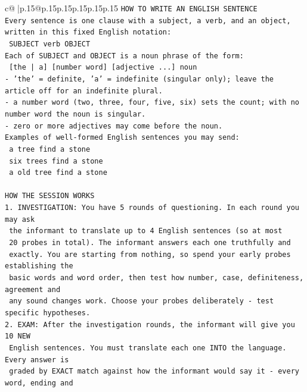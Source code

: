 \documentclass{article}
\begin{document}
{\begin{supertabular}{c@{$\;$}|p{.15\linewidth}@{}p{.15\linewidth}p{.15\linewidth}p{.15\linewidth}p{.15\linewidth}p{.15\linewidth}}
{{{\texttt{HOW TO WRITE AN ENGLISH SENTENCE} \\
\texttt{Every sentence is one clause with a subject, a verb, and an object, written in this fixed English notation:} \\
\texttt{    SUBJECT  verb  OBJECT} \\
\texttt{Each of SUBJECT and OBJECT is a noun phrase of the form:} \\
\texttt{    {[}the | a{]}  {[}number word{]}  {[}adjective ...{]}  noun} \\
\texttt{{-} 'the' = definite, 'a' = indefinite (singular only); leave the article off for an indefinite plural.} \\
\texttt{{-} a number word (two, three, four, five, six) sets the count; with no number word the noun is singular.} \\
\texttt{{-} zero or more adjectives may come before the noun.} \\
\texttt{Examples of well{-}formed English sentences you may send:} \\
\texttt{    a tree find a stone} \\
\texttt{    six trees find a stone} \\
\texttt{    a old tree find a stone} \\
\\ 
\texttt{HOW THE SESSION WORKS} \\
\texttt{1. INVESTIGATION: You have 5 rounds of questioning. In each round you may ask} \\
\texttt{   the informant to translate up to 4 English sentences (so at most} \\
\texttt{   20 probes in total). The informant answers each one truthfully and} \\
\texttt{   exactly. You are starting from nothing, so spend your early probes establishing the} \\
\texttt{   basic words and word order, then test how number, case, definiteness, agreement and} \\
\texttt{   any sound changes work. Choose your probes deliberately {-} test specific hypotheses.} \\
\texttt{2. EXAM: After the investigation rounds, the informant will give you 10 NEW} \\
\texttt{   English sentences. You must translate each one INTO the language. Every answer is} \\
\texttt{   graded by EXACT match against how the informant would say it {-} every word, ending and} \\
}}}
\end{supertabular}}
\end{document}
